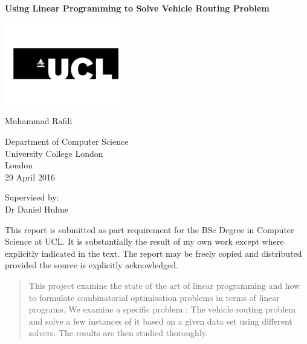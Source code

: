 \documentclass[a4paper, 12pt]{report}
\begin{document}
\begin{titlepage}
    \begin{center}
        \Huge
        \textbf{Using Linear Programming to Solve Vehicle Routing Problem}

        \vspace{1.5cm}

        \includegraphics[width=0.4\textwidth]{ucl-logo.jpg}
        
        \vspace{1.5cm}
        
        \Large   
        Muhammad Rafdi\\

        \vspace{0.8cm}

        Department of Computer Science\\
        University College London\\
        London\\
        29 April 2016

        \vspace{0.8cm}
        Supervised by:\\
        Dr Daniel Hulme       
        
        \vfill
                
        
        \normalsize   
        This report is submitted as part requirement for the BSc Degree in Computer Science at UCL. It is substantially the result of my own work except where explicitly indicated in the text. The report may be freely copied and distributed provided the source is explicitly acknowledged.

        
    \end{center}
\end{titlepage}


\begin{abstract}
\centering
   This project examine the state of the art of linear programming and how to formulate combinatorial optimisation problems in terms of linear programs. We examine a specific problem : The vehicle routing problem and solve a few instances of it based on a given data set using different solvers. The results are then studied thoroughly.
\end{abstract}
\end{document}
